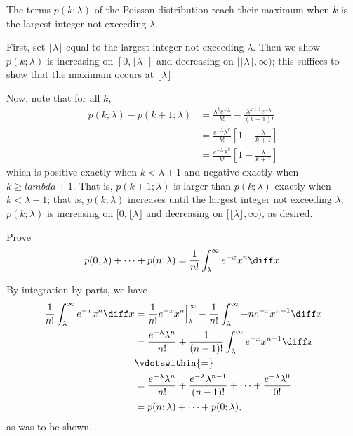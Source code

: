 \begin{problem}[Handout 10, \# 10]
  The terms \(p(k;\lambda)\) of the Poisson distribution reach their
  maximum when \(k\) is the largest integer not exceeding \(\lambda\).
\end{problem}
\begin{solution}
  First, set $\lfloor{\lambda}\rfloor$ equal to the largest integer not
  exceeding $\lambda$. Then we show $p(k;\lambda)$ is increasing on
  $[0,\lfloor{\lambda}\rfloor]$ and decreasing on
  $[\lfloor{\lambda}\rfloor, \infty)$; this suffices to show that the maximum
  occurs at $\lfloor{\lambda}\rfloor$.

  Now, note that for all $k$,
  \begin{align*}
    p(k; \lambda) - p(k+1;\lambda)
    &= \frac{\lambda^k e^{-\lambda}}{k!} -\frac{\lambda^{k+1} e^{-\lambda}}{(k+1)!}\\
    &= \frac{e^{-\lambda} \lambda^k}{k!} \left[ 1 -\frac{\lambda}{k+1} \right]\\
    &= \frac{e^{-\lambda} \lambda^k}{k!} \left[ 1 -\frac{\lambda}{k+1} \right]
  \end{align*}
  which is positive exactly when $k < \lambda +1$ and negative exactly when
  $k \geq lambda +1$. That is, $p(k+1;\lambda)$ is larger than
  $p(k; \lambda)$ exactly when $k < \lambda +1$; that is, $p(k;\lambda)$
  increases until the largest integer not exceeding $\lambda$;
  $p(k;\lambda)$ is increasing on $[0,\lfloor {\lambda} \rfloor$ and decreasing on
  $[\lfloor  {\lambda}\rfloor,\infty)$, as desired.
\end{solution}
\newpage

\begin{problem}[Handout 10, \# 11]
  Prove
  \[
    p(0,\lambda)+\dotsb+p(n,\lambda)
    =\frac{1}{n!}\int_\lambda^\infty e^{-x}x^n\diff x.
  \]
\end{problem}
\begin{solution}
  By integration by parts, we have
  \begin{align*}
    \frac{1}{n!}\int_\lambda^\infty e^{-x}x^n\diff x
    &=\frac{1}{n!}e^{-x}x^n\Bigr|_\lambda^\infty-\frac{1}{n!}\int_\lambda^\infty
      -ne^{-x}x^{n-1}\diff x\\
    &=\frac{e^{-\lambda}\lambda^n}{n!}+\frac{1}{(n-1)!}\int_\lambda^\infty
      e^{-x}x^{n-1}\diff x\\
    &\vdotswithin{=}\\
    &=\frac{e^{-\lambda}\lambda^n}{n!}+\frac{e^{-\lambda}\lambda^{n-1}}{(n-1)!}+\dotsb+
      \frac{e^{-\lambda}\lambda^{0}}{0!}\\
    &=p(n;\lambda)+\dotsb+p(0;\lambda),
  \end{align*}
  as was to be shown.
\end{solution}
\newpage


